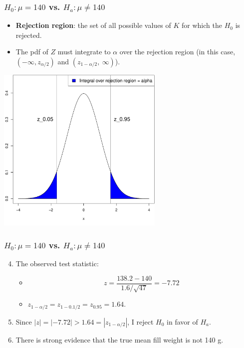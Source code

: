 \documentclass[handout]{beamer}\usepackage[]{graphicx}\usepackage[]{color}
\newenvironment{knitrout}{}{} %
\numberwithin{equation}{section}
\begin{document}
\begin{frame}[fragile]
\frametitle{ $H_0: \mu = 140$ vs. $H_a: \mu \ne 140$} \small
\begin{itemize}
\item {\bf Rejection region}: the set of all possible values of $K$ for which the $H_0$ is rejected.
\pause \item The pdf of $Z$ must integrate to $\alpha$ over the rejection region (in this case, $(-\infty, z_{\alpha/2})$ and $(z_{1-\alpha/2}, \ \infty)$).
\end{itemize}
\pause \begin{center}
\begin{knitrout}
\color{fgcolor}
\includegraphics[width=0.6\textwidth,height=0.6\textheight]{figure/unnamed-chunk-2-1} 

\end{knitrout}
\end{center}
\end{frame}

\begin{frame}
\frametitle{ $H_0: \mu = 140$ vs. $H_a: \mu \ne 140$} \small
\begin{enumerate}
\setcounter{enumi}{3}
\item The observed test statistic:
\begin{itemize}
\pause \item \[z = \frac{138.2 - 140}{1.6/\sqrt{47}} = -7.72\]
\pause \item $z_{1-\alpha/2} = z_{1-0.1/2} = z_{0.95} = 1.64$.
\end{itemize}
\pause \item Since $|z| = |-7.72| > 1.64 = |z_{1 - \alpha/2}|$, I reject $H_0$ in favor of $H_a$.
\pause \item There is strong evidence that the true mean fill weight is not 140 g.
\end{enumerate}
\end{frame}
\end{document}
